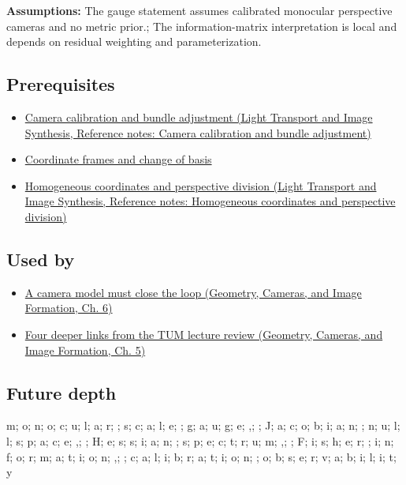 \textbf{Assumptions:} The gauge statement assumes calibrated monocular perspective cameras and no metric prior.; The information-matrix interpretation is local and depends on residual weighting and parameterization.

\subsection{Prerequisites}\label{appendix-113f0267e5f4-prerequisites}

\hypertarget{appendix-113f0267e5f4-prerequisites}{}

\begin{itemize}
\tightlist
\item
  \href{../04-Light-Transport-and-Image-Synthesis/main.pdf\#nameddest=appendix-3ee9861904d5}{Camera calibration and bundle adjustment (Light Transport and Image Synthesis, Reference notes: Camera calibration and bundle adjustment)}
\item
  \hyperref[appendix-1bae9457dbc3]{Coordinate frames and change of basis}
\item
  \href{../04-Light-Transport-and-Image-Synthesis/main.pdf\#nameddest=appendix-cb3b26862282}{Homogeneous coordinates and perspective division (Light Transport and Image Synthesis, Reference notes: Homogeneous coordinates and perspective division)}
\end{itemize}

\subsection{Used by}\label{appendix-113f0267e5f4-used-by}

\hypertarget{appendix-113f0267e5f4-used-by}{}

\begin{itemize}
\tightlist
\item
  \href{../03-Geometry-Cameras-and-Image-Formation/main.pdf\#nameddest=02-foundations-ii-ch037-a-camera-model-must-close-the-loop}{A camera model must close the loop (Geometry, Cameras, and Image Formation, Ch. 6)}
\item
  \href{../03-Geometry-Cameras-and-Image-Formation/main.pdf\#nameddest=02-foundations-ii-ch036-four-deeper-links-from-the-tum-lecture-review}{Four deeper links from the TUM lecture review (Geometry, Cameras, and Image Formation, Ch. 5)}
\end{itemize}

\subsection{Future depth}\label{appendix-113f0267e5f4-future-depth}

\hypertarget{appendix-113f0267e5f4-future-depth}{}

m; o; n; o; c; u; l; a; r; ; s; c; a; l; e; ; g; a; u; g; e; ,; ; J; a; c; o; b; i; a; n; ; n; u; l; l; s; p; a; c; e; ,; ; H; e; s; s; i; a; n; ; s; p; e; c; t; r; u; m; ,; ; F; i; s; h; e; r; ; i; n; f; o; r; m; a; t; i; o; n; ,; ; c; a; l; i; b; r; a; t; i; o; n; ; o; b; s; e; r; v; a; b; i; l; i; t; y
